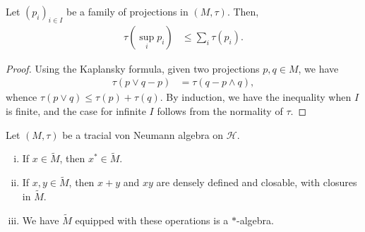 \documentclass[10pt]{mypackage}
\begin{document}
\begin{lemma}
  Let $\left( p_i \right)_{i\in I}$ be a family of projections in $\left( M,\tau \right)$. Then,
  \begin{align*}
    \tau\left( \sup_{i}p_i \right) &\leq \sum_{i}\tau\left( p_i \right).
  \end{align*}
\end{lemma}
\begin{proof}
  Using the Kaplansky formula, given two projections $p,q\in M$, we have
  \begin{align*}
    \tau\left( p\vee q-p \right) &= \tau\left( q-p\wedge q \right),
  \end{align*}
  whence $\tau\left( p\vee q \right)\leq \tau(p) + \tau(q)$. By induction, we have the inequality when $I$ is finite, and the case for infinite $I$ follows from the normality of $\tau$.
\end{proof}
\begin{theorem}
  Let $\left( M,\tau \right)$ be a tracial von Neumann algebra on $\mathcal{H}$.
  \begin{enumerate}[(i)]
    \item If $x\in \widetilde{M}$, then $x^{\ast}\in \widetilde{M}$.
    \item If $x,y\in \widetilde{M}$, then $x + y$ and $xy$ are densely defined and closable, with closures in $\widetilde{M}$.
    \item We have $\widetilde{M}$ equipped with these operations is a $\ast$-algebra.
  \end{enumerate}
\end{theorem}
\end{document}
